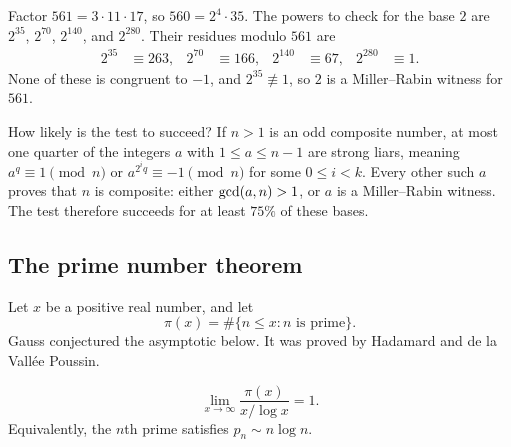 \begin{example}
Factor \(561=3\cdot 11\cdot 17\), so \(560=2^{4}\cdot 35\). The powers to check for the base \(2\) are \(2^{35}\), \(2^{70}\), \(2^{140}\), and \(2^{280}\). Their residues modulo \(561\) are
\begin{align*}
    2^{35}&\equiv 263, &
    2^{70}&\equiv 166, &
    2^{140}&\equiv 67, &
    2^{280}&\equiv 1.
\end{align*}
None of these is congruent to \(-1\), and \(2^{35}\not\equiv 1\), so \(2\) is a Miller--Rabin witness for \(561\).
\end{example}

How likely is the test to succeed? If \(n>1\) is an odd composite number, at most one quarter of the integers \(a\) with \(1\le a\le n-1\) are strong liars, meaning \(a^{q}\equiv 1\pmod{n}\) or \(a^{2^{i}q}\equiv -1\pmod{n}\) for some \(0\le i<k\). Every other such \(a\) proves that \(n\) is composite: either \(\operatorname{gcd}(a,n)>1\), or \(a\) is a Miller--Rabin witness. The test therefore succeeds for at least \(75\%\) of these bases.

\subsection{The prime number theorem}

Let \(x\) be a positive real number, and let
\[
    \pi(x)=\#\{n\le x:n\text{ is prime}\}.
\]
Gauss conjectured the asymptotic below. It was proved by Hadamard and de la Vall\'ee Poussin.

\begin{theorem}
\[
    \lim_{x\to\infty}\frac{\pi(x)}{x/\log x}=1.
\]
Equivalently, the \(n\)th prime satisfies \(p_{n}\sim n\log n\).
\end{theorem}



